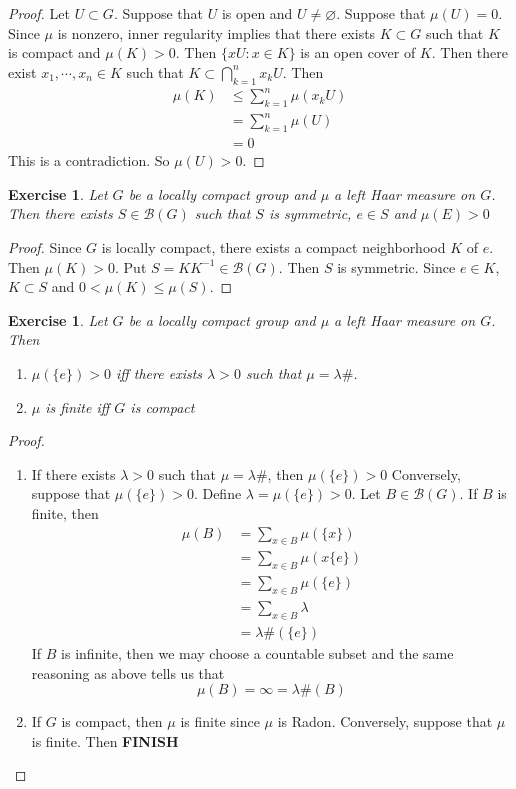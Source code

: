 \documentclass[12pt]{amsart}
\newtheorem{ex}[thm]{Exercise}
\newcommand{\lam}{\lambda}
\newcommand{\MB}{\mathcal{B}}
\begin{document}
	\begin{proof}
		Let $U \subset G$. Suppose that $U$ is open and $U \neq \varnothing$. Suppose that  $\mu(U) = 0$. Since $\mu$ is nonzero, inner regularity implies that there exists $K \subset G$ such that $K$ is compact and $\mu(K) > 0$. Then $ \{xU: x \in K\}$ is an open cover of $K$. Then there exist $x_1, \cdots, x_n \in K$ such that $K \subset \bigcap\limits_{k=1}^n x_kU$. Then 
		\begin{align}
			\mu(K) 
			& \leq \sum_{k =1}^n \mu(x_kU) \\
			& = \sum_{k =1}^n \mu(U) \\
			& = 0
		\end{align} 
		This is a contradiction. So $\mu(U) > 0$.
	\end{proof}

	\begin{ex}
		Let $G$ be a locally compact group and $\mu$ a left Haar measure on $G$. Then there exists $S \in \MB(G)$ such that $S$ is symmetric, $e \in S$ and $\mu(E) > 0$ 
	\end{ex}

	\begin{proof}
		Since $G$ is locally compact, there exists a compact neighborhood $K$ of $e$. Then $\mu(K) > 0$. Put $S = KK^{-1} \in \MB(G)$. Then $S$ is symmetric. Since $e \in K$, $K \subset S$ and $0 < \mu(K) \leq \mu(S)$.
	\end{proof}
	
	\begin{ex}
		Let $G$ be a locally compact group and $\mu$ a left Haar measure on $G$. Then 
		\begin{enumerate}
			\item  $\mu(\{e\}) > 0$ iff there exists $\lam >0$ such that $\mu = \lam \#$.
			\item $\mu$ is finite iff $G$ is compact
		\end{enumerate}
	\end{ex}

	\begin{proof}\
		\begin{enumerate}
			\item If there exists $\lam >0$ such that $\mu = \lam \#$, then $\mu(\{e\}) > 0$ Conversely, suppose that $\mu(\{e\}) > 0$. Define $\lam = \mu(\{e\}) > 0$. Let $B \in \MB(G)$. If $B$ is finite, then 
			\begin{align*}
				\mu(B) 
				& = \sum\limits_{x \in B}  \mu(\{x\}) \\
				& = \sum\limits_{x \in B} \mu(x \{e\}) \\
				& = \sum\limits_{x \in B} \mu( \{e\}) \\
				& = \sum\limits_{x \in B} \lam \\
				& = \lam \#(\{e\})
			\end{align*}
			If $B$ is infinite, then we may choose a countable subset and the same reasoning as above tells us that $$\mu(B) = \infty = \lam \#(B)$$
			\item If $G$ is compact, then $\mu$ is finite since $\mu$ is Radon. Conversely, suppose that $\mu$ is finite. Then \textbf{FINISH}
		\end{enumerate}
	\end{proof}
	
\end{document}
